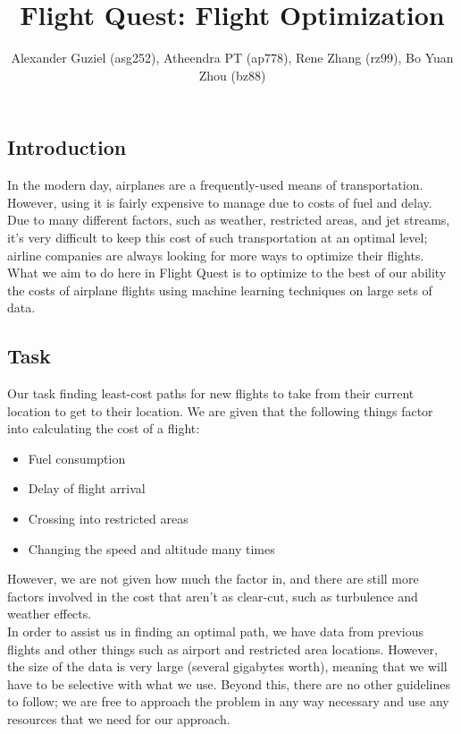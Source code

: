 \documentclass{article}[12pt]
\renewenvironment{abstract}
  {\center
  {\bfseries{\large\abstractname}}}
  {\center}
\begin{document}
\title{Flight Quest: Flight Optimization}
\author{
	Alexander Guziel (asg252), Atheendra PT (ap778), Rene Zhang (rz99), Bo Yuan Zhou (bz88)
}
\date{}
\maketitle

\begin{abstract}
\end{abstract}
\setlength{\columnsep}{1cm}
\begin{multicols}{2}

\section{Introduction}
In the modern day, airplanes are a frequently-used means of transportation. However, using it is fairly expensive to manage due to costs of fuel and delay. Due to many different factors, such as weather, restricted areas, and jet streams, it's very difficult to keep this cost of such transportation at an optimal level; airline companies are always looking for more ways to optimize their flights. What we aim to do here in Flight Quest is to optimize to the best of our ability the costs of airplane flights using machine learning techniques on large sets of data.

\subsection{Task}
Our task finding least-cost paths for new flights to take from their current location to get to their location. We are given that the following things factor into calculating the cost of a flight:
	\begin{itemize}
		\item Fuel consumption
		\item Delay of flight arrival
		\item Crossing into restricted areas
		\item Changing the speed and altitude many times
	\end{itemize}
However, we are not given how much the factor in, and there are still more factors involved in the cost that aren't as clear-cut, such as turbulence and weather effects.\\

In order to assist us in finding an optimal path, we have data from previous flights and other things such as airport and restricted area locations. However, the size of the data is very large (several gigabytes worth), meaning that we will have to be selective with what we use. Beyond this, there are no other guidelines to follow; we are free to approach the problem in any way necessary and use any resources that we need for our approach.


\end{multicols}
\end{document}
